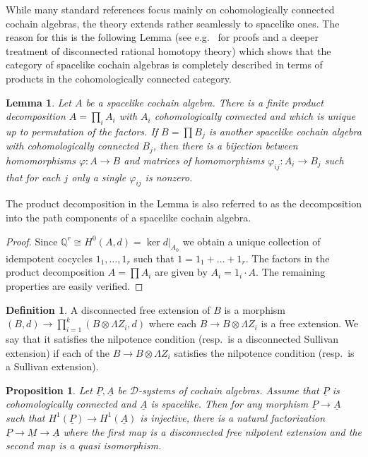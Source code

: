 \documentclass[12pt,a4paper]{article}
\newtheorem{prop}[thm]{Proposition}
\newtheorem{lem}[thm]{Lemma}
\theoremstyle{definition}
\newtheorem{defn}[thm]{Definition}
\begin{document}
While many standard references focus mainly on cohomologically connected cochain algebras, the theory extends rather seamlessly to spacelike ones. The reason for this is the following Lemma (see e.g.\ \cite[Theorem B, Principle 3.2]{LazarevMarkl} for proofs and a deeper treatment of disconnected rational homotopy theory) which shows that the category of spacelike cochain algebras is completely described in terms of products in the cohomologically connected category.

\begin{lem}\label{lem:disconnected}
Let $A$ be a spacelike cochain algebra. There is a finite product decomposition $A=\prod_i A_i$ with $A_i$ cohomologically connected and which is unique up to permutation of the factors. If $B=\prod B_j$ is another spacelike cochain algebra with cohomologically connected $B_j$, then there is a bijection between homomorphisms $\varphi\colon A\rightarrow B$ and matrices of homomorphisms $\varphi_{ij}\colon A_i\rightarrow B_j$ such that for each $j$ only a single $\varphi_{ij}$ is nonzero.
\end{lem}

The product decomposition in the Lemma is also referred to as the decomposition into the path components of a spacelike cochain algebra.

\begin{proof}
Since $\mathbb{Q}^r\cong H^0(A,d)=\ker d|_{A_{0}}$ we obtain a unique collection of idempotent cocycles $1_1,\ldots,1_r$ such that $1=1_1+\ldots+1_r$. The factors in the product decomposition $A=\prod A_i$ are given by $A_i=1_i\cdot A$. The remaining properties are easily verified.
\end{proof}



\begin{defn}
A disconnected free extension of $B$ is a morphism $(B,d)\rightarrow \prod^k_{i=1}(B\otimes \Lambda Z_i,d)$ where each $B\rightarrow B\otimes \Lambda Z_i$ is a free extension. We say that it satisfies the nilpotence condition (resp.\ is a disconnected Sullivan extension) if each of the $B\rightarrow B\otimes \Lambda Z_i$ satisfies the nilpotence condition (resp.\ is a Sullivan extension). 
\end{defn}

\begin{prop}\label{prop:Sullivandiagram}
Let $\underline{P},\underline{A}$ be $\mathcal{D}$-systems of cochain algebras. Assume that $\underline{P}$ is cohomologically connected and $\underline{A}$ is spacelike. Then for any morphism $\underline{P}\rightarrow\underline{A}$ such that $H^1(\underline{P})\rightarrow H^1(\underline{A})$ is injective, there is a natural factorization $\underline{P}\rightarrow \underline{M}\rightarrow\underline{A}$ where the first map is a disconnected free nilpotent extension and the second map is a quasi isomorphism.
\end{prop}
\end{document}
